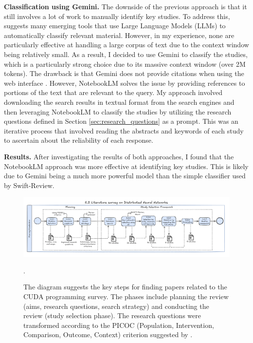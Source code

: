 \textbf{Classification using Gemini.}
The downside of the previous approach is that it still involves a lot of work to manually identify key
studies. To address this, \cite{bolanos_artificial_2024} suggests many emerging tools that use Large Language Models (LLMs)
to automatically classify relevant material. However, in my experience, none are particularly effective
at handling a large corpus of text due to the context window being relatively small. As a result, I decided
to use Gemini \cite{team_gemini_2024} to classify the studies, which is a particularly strong choice due to its massive
context window (over 2M tokens). The drawback is that Gemini does not provide citations when using the web interface 
\cite{noauthor_gemini_nodate}. However, NotebookLM \cite{notebooklm_google_2024} solves the issue by providing references 
to portions of the text that are relevant to the query. My approach involved downloading the search results in textual format from the
search engines and then leveraging NotebookLM to classify the studies by utilizing the research questions
defined in Section \ref{sec:research_questions} as a prompt. This was an iterative process that involved
reading the abstracts and keywords of each study to ascertain about the reliability of each response.

\textbf{Results.}
After investigating the results of both approaches, I found that the NotebookLM approach was more
effective at identifying key studies. This is likely due to Gemini being a much more powerful
model than the simple classifier used by Swift-Review.


\begin{figure}[th]
	\centering
	\includegraphics[width=\linewidth]{figures/survey-dnn.pdf}
	\caption{The diagram suggests the key steps for finding papers related to the CUDA programming survey. The phases
		include planning the review (aims, research questions, search strategy) and conducting the review (study selection phase). The research questions
		were transformed according to the PICOC (Population, Intervention, Comparison, Outcome, Context) criterion suggested by \cite{keele_systematic_2007}.}.
	\label{fig:workflow-study-cuda}
\end{figure}

